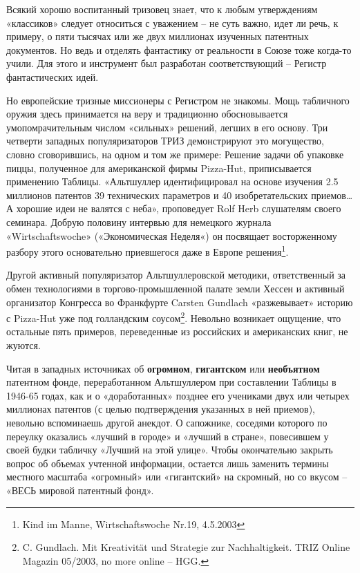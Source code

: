 \documentclass[11pt,a4paper]{article}
\begin{document}
Всякий хорошо воспитанный тризовец знает, что к любым утверждениям «классиков»
следует относиться с уважением -- не суть важно, идет ли речь, к примеру, о
пяти тысячах или же двух миллионах изученных патентных документов. Но ведь и
отделять фантастику от реальности в Союзе тоже когда-то учили. Для этого и
инструмент был разработан соответствующий -- Регистр фантастических идей.

Но европейские тризные миссионеры с Регистром не знакомы. Мощь табличного
оружия здесь принимается на веру и традиционно обосновывается
умопомрачительным числом «сильных» решений, легших в его основу. Три четверти
западных популяризаторов ТРИЗ демонстрируют это могущество, словно
сговорившись, на одном и том же примере: Решение задачи об упаковке пиццы,
полученное для американской фирмы Pizza-Hut, приписывается применению
Таблицы. «Альтшуллер идентифицировал на основе изучения 2.5 миллионов патентов
39 технических параметров и 40 изобретательских приемов… А хорошие идеи не
валятся с неба», проповедует Rolf Herb слушателям своего семинара. Добрую
половину интервью для немецкого журнала «Wirtschaftswoche» («Экономическая
Неделя«) он посвящает восторженному разбору этого основательно приевшегося
даже в Европе решения\footnote{Kind im Manne, Wirtschaftswoche Nr.19,
  4.5.2003}.

Другой активный популяризатор Альтшуллеровской методики, ответственный за
обмен технологиями в торгово-промышленной палате земли Хессен и активный
организатор Конгресса во Франкфурте Carsten Gundlach «разжевывает» историю с
Pizza-Hut уже под голландским соусом\footnote{C. Gundlach. Mit Kreativität und
  Strategie zur Nachhaltigkeit. TRIZ Online Magazin 05/2003, no more online --
  HGG.}. Невольно возникает ощущение, что остальные пять примеров,
переведенные из российских и американских книг, не жуются.

Читая в западных источниках об \textbf{огромном}, \textbf{гигантском} или
\textbf{необъятном} патентном фонде, переработанном Альтшуллером при
составлении Таблицы в 1946-65 годах, как и о «доработанных» позднее его
учениками двух или четырех миллионах патентов (с целью подтверждения указанных
в ней приемов), невольно вспоминаешь другой анекдот. О сапожнике, соседями
которого по переулку оказались «лучший в городе» и «лучший в стране»,
повесившем у своей будки табличку «Лучший на этой улице». Чтобы окончательно
закрыть вопрос об объемах учтенной информации, остается лишь заменить термины
местного масштаба «огромный» или «гигантский» на скромный, но со вкусом --
«ВЕСЬ мировой патентный фонд».
\end{document}
